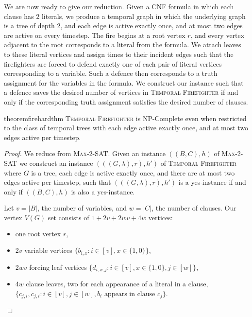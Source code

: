 \documentclass[a4paper,UKenglish,cleveref, autoref, thm-restate]{lipics-v2021} %
\begin{document}
\begin{toappendix}
We are now ready to give our reduction. Given a CNF formula in which each clause has 2 literals, we produce a temporal graph in which the underlying graph is a tree of depth 2, and each edge is active exactly once, and at most two edges are active on every timestep. The fire begins at a root vertex $r$, and every vertex adjacent to the root corresponds to a literal from the formula. We attach leaves to these literal vertices and assign times to their incident edges such that the firefighters are forced to defend exactly one of each pair of literal vertices corresponding to a variable. Such a defence then corresponds to a truth assignment for the variables in the formula. We construct our instance such that a defence saves the desired number of vertices in \textsc{Temporal Firefighter} if and only if the corresponding truth assignment satisfies the desired number of clauses.

\begin{restatable}{theorem}{firehardthm}\label{thm:firefighter-hard-appendix}
\textsc{Temporal Firefighter} is NP-Complete even when restricted to the class of temporal trees with each edge active exactly once, and at most two edges active per timestep.
\end{restatable}
\begin{proof}
We reduce from \textsc{Max-2-SAT}. Given an instance $((B, C), h)$ of \textsc{Max-2-SAT} we construct an instance $(((G, \lambda), r), h')$ of \textsc{Temporal Firefighter} where $G$ is a tree, each edge is active exactly once, and there are at most two edges active per timestep, such that $(((G, \lambda), r), h')$ is a yes-instance if and only if $((B, C), h)$ is also a yes-instance.

Let $v=|B|$, the number of variables, and $w=|C|$, the number of clauses. Our vertex $V(G)$ set consists of $1+2v+2wv+4w$ vertices:
\begin{itemize}
    \item one root vertex $r$,
    \item $2v$ variable vertices $\{b_{i,x} : i \in [v], x \in \{1,0\}\}$,
    \item $2wv$ forcing leaf vertices $\{d_{i,x,j} : i \in [v], x \in \{1,0\}, j \in [w]\}$,
    \item $4w$ clause leaves, two for each appearance of a literal in a clause, $\{c_{j,i}, \bar{c}_{j,i} : i \in [v], j \in [w], b_i \text{ appears in clause } c_j\}$.
\end{itemize}


\end{proof}
\end{toappendix}
\end{document}
